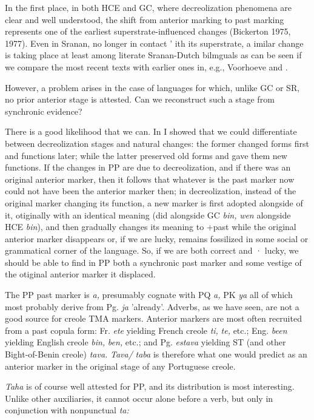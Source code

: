 In the first place, in both HCE and GC, where decreolization phenomena are clear and well understood, the shift from anterior mark\-ing to past marking represents one of the earliest superstrate-influenced changes (Bickerton 1975, 1977). Even in Sranan, no longer in contact ' ith its superstrate, a imilar change is taking place at least among literate Sranan-Dutch bilmguals as can be seen if we compare the
most recent texts with earlier ones in, e.g., Voorhoeve and \citet{Lichtveld1976}.

However, a problem arises in the case of languages for which, unlike GC or SR, no prior anterior stage is attested. Can we reconstruct such a stage from synchronic evidence?

There is a good likelihood that we can. In \citet{Bickerton1980} I showed that we could differentiate between decreolization stages and natural changes: the former changed forms first and functions later; while the latter preserved old forms and gave them new functions. If the changes in PP are due to decreolization, and if there was an original anterior marker, then it follows that whatever is the past
marker now could not have been the anterior marker then; in decreoli\-zation, instead of the original marker changing its function, a new marker is first adopted alongside of it, otiginally with an identical meaning (did alongside GC \textit{bin,} \textit{wen} alongside HCE \textit{bin}), and then gradually changes its meaning to +past while the original anterior marker disappears or, if we are lucky, remains fossilized in some social or grammatical corner of the language. So, if we are both correct and · lucky, we should be able to find in PP both a synchronic past marker
and some vestige of the otiginal anterior marker it displaced.

The PP past marker is \textit{a,} presumably cognate with PQ \textit{a,} PK \textit{ya} all of which most probably derive from Pg. \textit{ja }'already'. Adverbs, as we have seen, are not a good source for creole TMA markers. Anterior markers are most often recruited from a past copula form: Fr. \textit{ete}
yielding French creole \textit{ti,} \textit{te,} etc.; Eng. \textit{been} yielding English creole \textit{bin,} \textit{ben,} etc.; and Pg. \textit{estava} yielding ST (and other Bight-of-Benin creole) \textit{tava.} \textit{Tava/} \textit{taba} is therefore what one would predict as an anterior marker in the original stage of any Portuguese creole.

\textit{Taha} is of course well attested for PP, and its distribution is most
interesting. Unlike other auxiliaries, it cannot occur alone before a verb, but only in conjunction with nonpunctual \textit{ta:}

